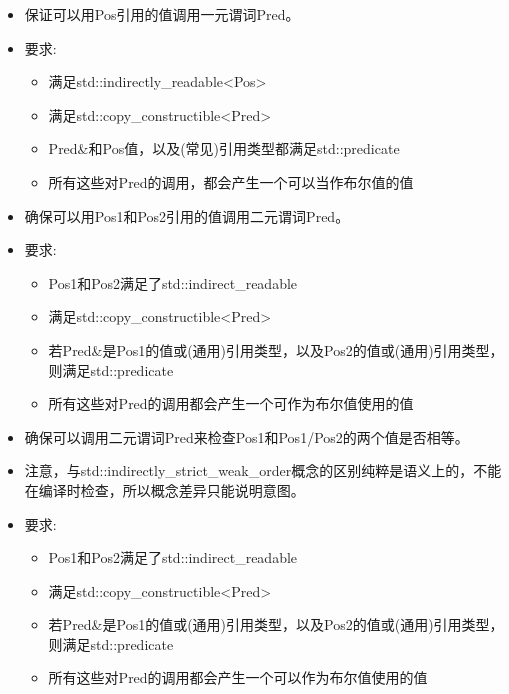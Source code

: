 \begin{itemize}
\item
保证可以用Pos引用的值调用一元谓词Pred。

\item
要求:
\begin{itemize}
\item
满足std::indirectly\_readable<Pos>

\item
满足std::copy\_constructible<Pred>

\item
Pred\&和Pos值，以及(常见)引用类型都满足std::predicate

\item
所有这些对Pred的调用，都会产生一个可以当作布尔值的值
\end{itemize}
\end{itemize}


\begin{itemize}
\item
确保可以用Pos1和Pos2引用的值调用二元谓词Pred。

\item
要求:
\begin{itemize}
\item
Pos1和Pos2满足了std::indirect\_readable

\item
满足std::copy\_constructible<Pred>

\item
若Pred\&是Pos1的值或(通用)引用类型，以及Pos2的值或(通用)引用类型，则满足std::predicate

\item
所有这些对Pred的调用都会产生一个可作为布尔值使用的值
\end{itemize}
\end{itemize}


\begin{itemize}
\item
确保可以调用二元谓词Pred来检查Pos1和Pos1/Pos2的两个值是否相等。

\item
注意，与std::indirectly\_strict\_weak\_order概念的区别纯粹是语义上的，不能在编译时检查，所以概念差异只能说明意图。

\item
要求:
\begin{itemize}
\item
Pos1和Pos2满足了std::indirect\_readable

\item
满足std::copy\_constructible<Pred>

\item
若Pred\&是Pos1的值或(通用)引用类型，以及Pos2的值或(通用)引用类型，则满足std::predicate

\item
所有这些对Pred的调用都会产生一个可以作为布尔值使用的值
\end{itemize}
\end{itemize}

